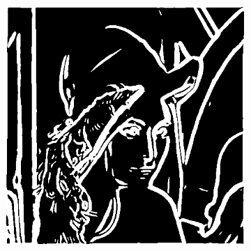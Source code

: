 \documentclass[a4paper]{article}
\begin{document}
\begin{figure}[h]
\begin{subfigure}{0.33\textwidth}
\end{subfigure}
\begin{subfigure}{0.33\textwidth}
\includegraphics[width=\textwidth]{img/sigma3/lenast.png}
\end{subfigure}


\end{figure}
\end{document}
